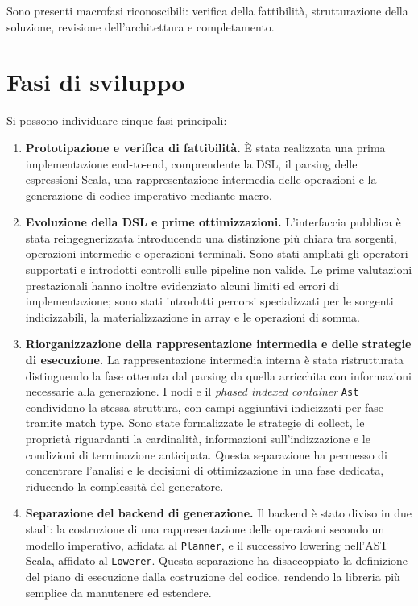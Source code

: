 \documentclass[a4paper,11pt]{report}
\theoremstyle{definition}
\begin{document}
Sono presenti macrofasi riconoscibili: verifica della fattibilità, strutturazione della soluzione, revisione dell'architettura e completamento.
\section{Fasi di sviluppo}
\label{sec:fasi-sviluppo}

Si possono individuare cinque fasi principali:

\begin{enumerate}
  \item \textbf{Prototipazione e verifica di fattibilità.}
    È stata realizzata una prima implementazione end-to-end, comprendente la DSL, il parsing delle espressioni Scala, una rappresentazione intermedia delle operazioni e la generazione di codice imperativo mediante macro.

  \item \textbf{Evoluzione della DSL e prime ottimizzazioni.}
    L'interfaccia pubblica è stata reingegnerizzata introducendo una distinzione più chiara tra sorgenti, operazioni intermedie e operazioni terminali. Sono stati ampliati gli operatori supportati e introdotti controlli sulle pipeline non valide. Le prime valutazioni prestazionali hanno inoltre evidenziato alcuni limiti ed errori di implementazione; sono stati introdotti percorsi specializzati per le sorgenti indicizzabili, la materializzazione in array e le operazioni di somma.

  \item \textbf{Riorganizzazione della rappresentazione intermedia e delle strategie di esecuzione.}
    La rappresentazione intermedia interna è stata ristrutturata distinguendo la fase ottenuta dal parsing da quella arricchita con informazioni necessarie alla generazione. I nodi e il \emph{phased indexed container} \texttt{Ast} condividono la stessa struttura, con campi aggiuntivi indicizzati per fase tramite match type. Sono state formalizzate le strategie di collect, le proprietà riguardanti la cardinalità, informazioni sull'indizzazione e le condizioni di terminazione anticipata. Questa separazione ha permesso di concentrare l'analisi e le decisioni di ottimizzazione in una fase dedicata, riducendo la complessità del generatore.

  \item \textbf{Separazione del backend di generazione.}
    Il backend è stato diviso in due stadi: la costruzione di una rappresentazione delle operazioni secondo un modello imperativo, affidata al \texttt{Planner}, e il successivo lowering nell'AST Scala, affidato al \texttt{Lowerer}. Questa separazione ha disaccoppiato la definizione del piano di esecuzione dalla costruzione del codice, rendendo la libreria più semplice da manutenere ed estendere.


\end{enumerate}
\end{document}
